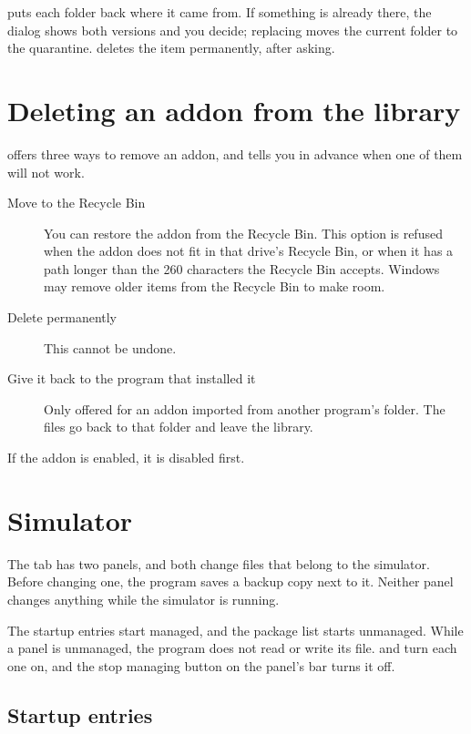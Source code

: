 \documentclass[11pt,a4paper]{article}
\begin{document}

 puts each folder back where it came from. If something is already
there, the dialog shows both versions and you decide; replacing moves the
current folder to the quarantine.  deletes the item permanently,
after asking.

\section{Deleting an addon from the library}

 offers three ways to remove an addon, and tells you in advance when
one of them will not work.

\begin{description}
  \item[Move to the Recycle Bin] You can restore the addon from the Recycle Bin.
    This option is refused when the addon does not fit in that drive's Recycle
    Bin, or when it has a path longer than the 260 characters the Recycle Bin
    accepts. Windows may remove older items from the Recycle Bin to make room.
  \item[Delete permanently] This cannot be undone.
  \item[Give it back to the program that installed it] Only offered for an
    addon imported from another program's folder. The files go back to that
    folder and leave the library.
\end{description}

If the addon is enabled, it is disabled first.

\section{Simulator}

The  tab has two panels, and both change files that belong to the
simulator. Before changing one, the program saves a backup copy next to it.
Neither panel changes anything while the simulator is running.

The startup entries start managed, and the package list starts unmanaged. While
a panel is unmanaged, the program does not read or write its file.  and  turn each one on, and the
stop managing button on the panel's bar turns it off.

\subsection{Startup entries}
\end{document}
